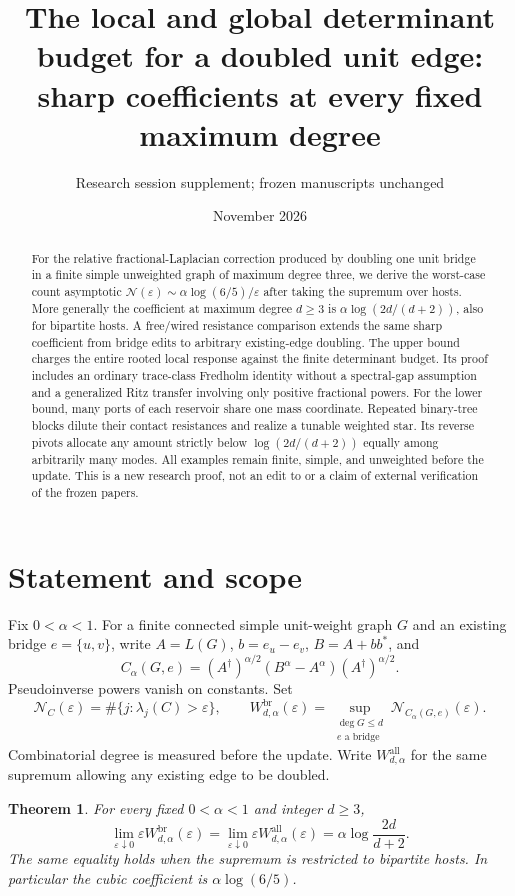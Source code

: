 \documentclass[11pt]{article}
\title{The local and global determinant budget for a doubled unit edge:\\
sharp coefficients at every fixed maximum degree}
\author{Research session supplement; frozen manuscripts unchanged}
\date{November 2026}
\newtheorem{theorem}{Theorem}[section]
\newcommand{\N}{\mathcal N}
\begin{document}
\maketitle
\begin{abstract}
For the relative fractional-Laplacian correction produced by doubling
one unit bridge in a finite simple unweighted graph of maximum degree
three, we derive the worst-case count asymptotic
$\N(\varepsilon)\sim\alpha\log(6/5)/\varepsilon$ after taking the
supremum over hosts. More generally the coefficient at maximum degree
$d\ge3$ is $\alpha\log(2d/(d+2))$, also for bipartite hosts.
A free/wired resistance comparison extends the same sharp coefficient
from bridge edits to arbitrary existing-edge doubling.
The upper bound charges the entire rooted local
response against the finite determinant budget. Its proof includes an
ordinary trace-class Fredholm identity without a spectral-gap assumption
and a generalized Ritz transfer involving only positive fractional
powers. For the lower bound, many ports of each reservoir share one
mass coordinate. Repeated binary-tree blocks dilute their contact
resistances and realize a tunable weighted star. Its reverse pivots
allocate any amount strictly below $\log(2d/(d+2))$ equally among arbitrarily
many modes. All examples remain finite, simple, and unweighted before the
update. This is a new research proof,
not an edit to or a claim of external verification of the frozen papers.
\end{abstract}

\section{Statement and scope}
Fix $0<\alpha<1$. For a finite connected simple unit-weight graph $G$
and an existing bridge $e=\{u,v\}$, write $A=L(G)$, $b=e_u-e_v$,
$B=A+bb^*$, and
\[
 C_\alpha(G,e)=(A^\dagger)^{\alpha/2}(B^\alpha-A^\alpha)
                                      (A^\dagger)^{\alpha/2}.
\]
Pseudoinverse powers vanish on constants. Set
\[
 \N_C(\varepsilon)=\#\{j:\lambda_j(C)>\varepsilon\},\qquad
 W^{\mathrm{br}}_{d,\alpha}(\varepsilon)
   =\sup_{\substack{\deg G\le d\\e\text{ a bridge}}}
                                    \N_{C_\alpha(G,e)}(\varepsilon).
\]
Combinatorial degree is measured before the update.
Write $W^{\mathrm{all}}_{d,\alpha}$ for the same supremum allowing
any existing edge to be doubled.

\begin{theorem}\label{thm:sharp}
For every fixed $0<\alpha<1$ and integer $d\ge3$,
\[
 \lim_{\varepsilon\downarrow0}\varepsilon
               W^{\mathrm{br}}_{d,\alpha}(\varepsilon)
 =\lim_{\varepsilon\downarrow0}\varepsilon
               W^{\mathrm{all}}_{d,\alpha}(\varepsilon)
 =\alpha\log\frac{2d}{d+2}.
\]
The same equality holds when the supremum is restricted to bipartite
hosts. In particular the cubic coefficient is $\alpha\log(6/5)$.
\end{theorem}
\end{document}
